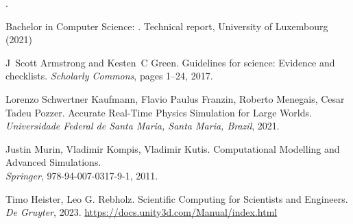 \documentclass[conference,compsoc]{IEEEtran}
\begin{document}
%
%
%
\begin{thebibliography}{1}
.

{Bachelor in Computer Science}:
.
\newblock Technical report, University of Luxembourg (2021)

J~Scott Armstrong and Kesten~C Green.
\newblock Guidelines for science: Evidence and checklists.
\newblock \emph{Scholarly Commons}, pages 1--24, 2017.

Lorenzo Schwertner Kaufmann, Flavio Paulus Franzin, Roberto Menegais, Cesar Tadeu Pozzer.
\newblock Accurate Real-Time Physics Simulation for Large Worlds.
\newblock \emph{Universidade Federal de Santa Maria, Santa Maria, Brazil}, 2021.

Justin Murin, Vladimir Kompis, Vladimir Kutis.
\newblock Computational Modelling and Advanced Simulations. \\
\newblock \emph{Springer}, 978-94-007-0317-9-1, 2011.

Timo Heister, Leo G. Rebholz.
\newblock Scientific Computing for Scientists and Engineers.
\newblock \emph{De Gruyter}, 2023.
\newblock \href{https://docs.unity3d.com/Manual/index.html}{https://docs.unity3d.com/Manual/index.html}

\end{thebibliography}
\clearpage
\end{document}
